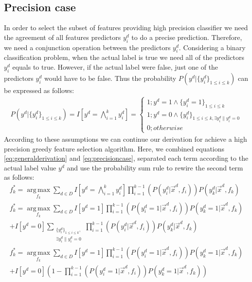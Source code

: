 \documentclass{article}
\begin{document}
\subsection{Precision case}
In order to select the subset of features providing high precision classifier we need the agreement of all features predictors $y^d_i$ to do a precise prediction. Therefore, we need a conjunction operation between the predictors $y^d_i$. Considering a binary classification problem, when the actual label is true we need all of the predictors $y^d_i$ equals to true. However, if the actual label were false, just one of the predictors $y^d_i$ would have to be false. Thus the probability  $P(y^d| \{y^d_i\}_{1 \leq i \leq k})$ can be expressed as follows:
\begin{gather}
P(y^d| \{y^d_i\}_{1 \leq i \leq k}) = I\left[y^d = \bigwedge_{i=1}^k y^d_i \right] = 
\begin{cases}
     1 ; y^d = 1 \wedge \{y_i^d = 1\}_{1 \leq i \leq k}\\
     1 ; y^d = 0 \wedge \{y_i^d\}_{1 \leq i \leq k, \exists{y_i^d\|y_i^d = 0}}\\
     0 ; otherwise
\end{cases}\label{eq:precisioncase}
\end{gather}
According to these assumptions we can continue our derivation for achieve a high precision greedy feature selection algorithm. Here, we combined equations \eqref{eq:generalderivation} and \eqref{eq:precisioncase}, separated each term according to the actual label value $y^d$ and use the probability sum rule to rewire the second term as follows:
\begin{gather}
f_{k}^* = \operatorname*{arg\,max}_{f_k} \sum_{d \in D} I\left[y^d = \bigwedge_{i=1}^k y^d_i \right] \prod_{i=1}^{k-1}\left(P(y_i^d |\vec{x}^d, f_i)\right)P(y_k^d |\vec{x}^d, f_k)\\
f_{k}^* = \operatorname*{arg\,max}_{f_k} \sum_{d \in D} I[y^d = 1] \prod_{i=1}^{k-1}\left(P(y_i^d = 1 |\vec{x}^d, f_i)\right)P(y_k^d = 1 |\vec{x}^d, f_k)\\ + I[y^d = 0] \sum_{\substack{\{y_i^d\}_{1 \leq i \leq k},\\ \exists{y_i^d\| y_i^d = 0} }} \prod_{i=1}^{k-1}\left(P(y_i^d |\vec{x}^d, f_i)\right)P(y_k^d |\vec{x}^d, f_k)\\
f_{k}^* = \operatorname*{arg\,max}_{f_k} \sum_{d \in D} I[y^d = 1] \prod_{i=1}^{k-1}\left(P(y_i^d = 1 |\vec{x}^d, f_i)\right)P(y_k^d = 1 |\vec{x}^d, f_k)\\ + I[y^d = 0]\left(1 - \prod_{i=1}^{k-1}\left(P(y_i^d = 1 |\vec{x}^d, f_i)\right)P(y_k^d = 1 |\vec{x}^d, f_k) \right)\label{eq:equationForPrecisionCase}
\end{gather}
\end{document}
